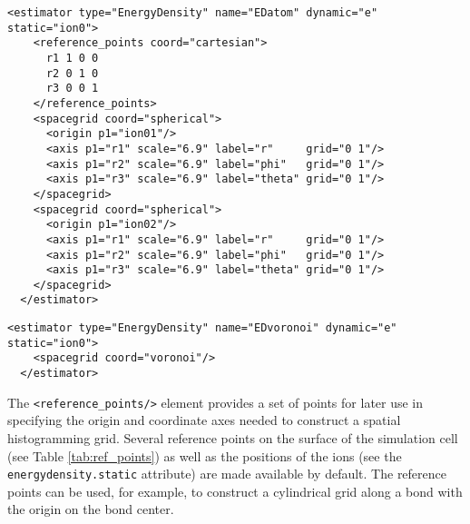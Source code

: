 \begin{lstlisting}[caption=Energy density estimator accumulated within spheres of radius 6.9 Bohr centered on the first and second atoms in the ion0 particleset.]
  <estimator type="EnergyDensity" name="EDatom" dynamic="e" static="ion0">
    <reference_points coord="cartesian">
      r1 1 0 0 
      r2 0 1 0
      r3 0 0 1
    </reference_points>
    <spacegrid coord="spherical">
      <origin p1="ion01"/>
      <axis p1="r1" scale="6.9" label="r"     grid="0 1"/>
      <axis p1="r2" scale="6.9" label="phi"   grid="0 1"/>
      <axis p1="r3" scale="6.9" label="theta" grid="0 1"/>
    </spacegrid>
    <spacegrid coord="spherical">
      <origin p1="ion02"/>
      <axis p1="r1" scale="6.9" label="r"     grid="0 1"/>
      <axis p1="r2" scale="6.9" label="phi"   grid="0 1"/>
      <axis p1="r3" scale="6.9" label="theta" grid="0 1"/>
    </spacegrid>
  </estimator>
\end{lstlisting}


\begin{lstlisting}[caption=Energy density estimator accumulated within Voronoi polyhedra centered on the ions.]
  <estimator type="EnergyDensity" name="EDvoronoi" dynamic="e" static="ion0">
    <spacegrid coord="voronoi"/>
  </estimator>
\end{lstlisting}



The \texttt{<reference\_points/>} element provides a set of points for later use in specifying the origin and coordinate axes needed to construct a spatial histogramming grid.  Several reference points on the surface of the simulation cell (see Table \ref{tab:ref_points}) as well as the positions of the ions (see the \texttt{energydensity.static} attribute) are made available by default.  The reference points can be used, for example, to construct a cylindrical grid along a bond with the origin on the bond center. 

